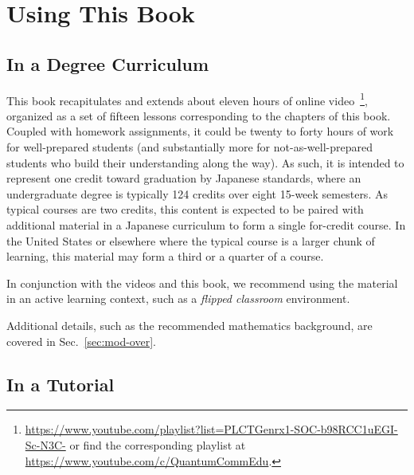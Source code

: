 \chapter*{Using This Book}

\section*{In a Degree Curriculum}

This book recapitulates and extends about eleven hours of online video~\footnote{\url{https://www.youtube.com/playlist?list=PLCTGenrx1-SOC-b98RCC1uEGI-Sc-N3C-} or find the corresponding playlist at \url{https://www.youtube.com/c/QuantumCommEdu}.}, organized as a set of fifteen lessons corresponding to the chapters of this book. Coupled with homework assignments, it could be twenty to forty hours of work for well-prepared students (and substantially more for not-as-well-prepared students who build their understanding along the way).  As such, it is intended to represent one credit toward graduation by Japanese standards, where an undergraduate degree is typically 124 credits over eight 15-week semesters. As typical courses are two credits, this content is expected to be paired with additional material in a Japanese curriculum to form a single for-credit course. In the United States or elsewhere where the typical course is a larger chunk of learning, this material may form a third or a quarter of a course.

In conjunction with the videos and this book, we recommend using the material in an active learning context, such as a \emph{flipped classroom} environment.

Additional details, such as the recommended mathematics background, are covered in Sec.~\ref{sec:mod-over}.

\section*{In a Tutorial}

